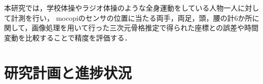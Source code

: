 \documentclass[titlepage]{jarticle}
\begin{document}


本研究では，学校体操やラジオ体操のような全身運動をしている人物一人に対して計測を行い，
mocopiのセンサの位置に当たる両手，両足，頭，腰の計6か所に関して，画像処理を用いて行った三次元骨格推定で得られた座標との誤差や時間変動を比較することで精度を評価する．
%
%
%

%
%
%
%
%

%
%
%
%
\section{研究計画と進捗状況}
%

%
%
%
\end{document}
